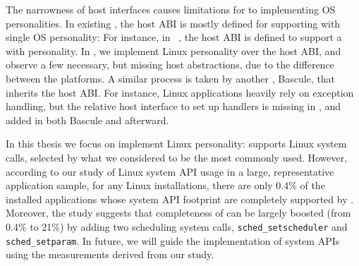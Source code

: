 The narrowness of host interfaces causes limitations for \liboses{} to implementing OS personalities.
In existing \liboses{},
the host ABI is mostly defined for supporting \liboses{} with single OS personality:
For instance, in \drawbridge{}~\citep{porter11drawbridge}, the host ABI
is defined to support a \libos{} with \win{} personality.
In \graphene{}, we implement Linux personality over the \drawbridge{} host ABI,
and observe a few necessary, but missing host abstractions,
due to the difference between the platforms.
A similar process is taken by another \libos{}, Bascule, that inherits the \drawbridge{} host ABI.
For instance, Linux applications heavily rely on exception handling,
but the relative host interface to set up handlers
is missing in \drawbridge{}, and added in both Bascule and \graphene{} afterward.

In this thesis we focus on implement Linux personality:
\graphene{} supports \syscalls{} Linux system calls,
selected by what we considered to be the most commonly used.
However, according to our study of Linux system API usage in a large, representative application sample,
for any Linux installations,
there are only 0.4\% of the installed applications whose system API footprint
are completely supported by \graphene{}.
Moreover, the study suggests that completeness of \graphene{} can be largely boosted (from 0.4\% to 21\%)
by adding two scheduling system calls,
{\tt sched\_setscheduler} and {\tt sched\_setparam}.
In future, we will guide the implementation of system APIs
using the measurements derived from our study.


